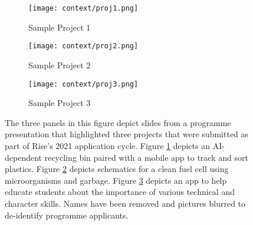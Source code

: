 \begin{figure}[htbp]
    \centering
    \begin{subfigure}{.45\textwidth}
        \centering
        \texttt{[image: context/proj1.png]}
        \caption{Sample Project 1}
        \label{sfig:can}
    \end{subfigure}
    \hfill
    \vspace{1em}
    \begin{subfigure}{.45\textwidth}
        \centering
        \texttt{[image: context/proj2.png]}
        \caption{Sample Project 2}
        \label{sfig:cell}
    \end{subfigure}
    \hfill
    \vspace{1em}
    \begin{subfigure}{.45\textwidth}
        \centering
        \texttt{[image: context/proj3.png]} 
        \caption{Sample Project 3}
        \label{sfig:app}
    \end{subfigure}
    \caption{The three panels in this figure depict slides from a programme presentation that highlighted three projects that were submitted as part of Rise's 2021 application cycle. Figure \ref{sfig:can} depicts an AI-dependent recycling bin paired with a mobile app to track and sort plastics. Figure \ref{sfig:cell} depicts schematics for a clean fuel cell using microorganisms and garbage. Figure \ref{sfig:app} depicts an app to help educate students about the importance of various technical and character skills. Names have been removed and pictures blurred to de-identify programme applicants.}
    \label{fig:example_projects}
\end{figure}

